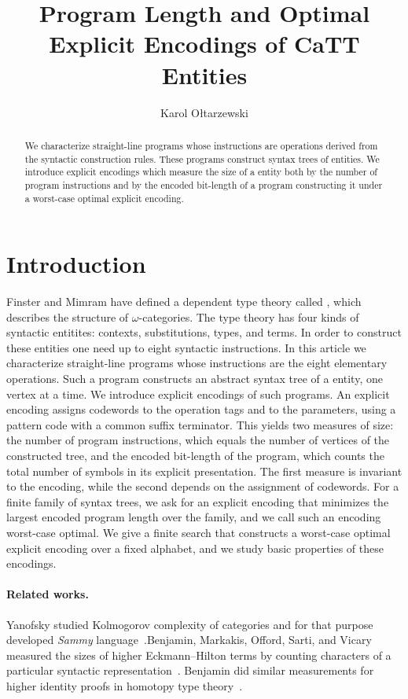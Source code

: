 \documentclass{article}%
\title{Program Length and Optimal Explicit Encodings of CaTT Entities}
\author{Karol Ołtarzewski}
\theoremstyle{remark}
\theoremstyle{definition}
\theoremstyle{definition}
\theoremstyle{plain}
\begin{document}
\maketitle

\begin{abstract}
We characterize straight-line programs whose instructions are operations derived
from the \catt syntactic construction rules. These programs construct syntax
trees of \catt entities. We introduce explicit encodings which measure the size
of a \catt entity both by the number of program instructions and by the encoded
bit-length of a program constructing it under a worst-case optimal explicit
encoding.
\end{abstract}

\section{Introduction}
Finster and Mimram have defined a dependent type theory called \catt, which
describes the structure of \(\omega\)-categories. The type theory \catt has four
kinds of syntactic entitites: contexts, substitutions, types, and terms. In
order to construct these entities one need up to eight syntactic instructions.
In this article we characterize straight-line programs whose instructions are
the eight elementary operations. Such a program constructs an abstract syntax
tree of a \catt entity, one vertex at a time. We introduce explicit encodings of
such programs. An explicit encoding assigns codewords to the operation tags and
to the parameters, using a pattern code with a common suffix terminator. This
yields two measures of size: the number of program instructions, which equals
the number of vertices of the constructed tree, and the encoded bit-length of
the program, which counts the total number of symbols in its explicit
presentation. The first measure is invariant to the encoding, while the second
depends on the assignment of codewords. For a finite family of \catt syntax
trees, we ask for an explicit encoding that minimizes the largest encoded
program length over the family, and we call such an encoding worst-case optimal.
We give a finite search that constructs a worst-case optimal explicit encoding
over a fixed alphabet, and we study basic properties of these encodings.

\paragraph{Related works.}
Yanofsky studied Kolmogorov complexity of categories and for that purpose
developed \emph{Sammy} language~\cite{Yanofsky}.Benjamin, Markakis, Offord,
Sarti, and Vicary measured the sizes of higher Eckmann--Hilton terms by counting
characters of a particular syntactic representation~\cite{Beyond_eh}. Benjamin
did similar measurements for higher identity proofs in homotopy type
theory~\cite{benjamin_higher_identity}.
\end{document}
